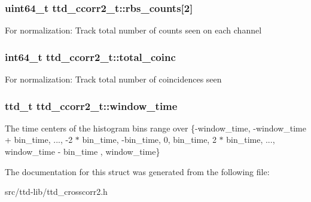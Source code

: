 \subsubsection[{rbs\+\_\+counts}]{\setlength{\rightskip}{0pt plus 5cm}uint64\+\_\+t ttd\+\_\+ccorr2\+\_\+t\+::rbs\+\_\+counts\mbox{[}2\mbox{]}}\label{structttd__ccorr2__t_a8413d9d1551e1fafbaf6d168ca997b0c}
For normalization\+: Track total number of counts seen on each channel \hypertarget{structttd__ccorr2__t_a127fca4b0a397dc24cf6c3165273ca97}{}
\subsubsection[{total\+\_\+coinc}]{\setlength{\rightskip}{0pt plus 5cm}int64\+\_\+t ttd\+\_\+ccorr2\+\_\+t\+::total\+\_\+coinc}\label{structttd__ccorr2__t_a127fca4b0a397dc24cf6c3165273ca97}
For normalization\+: Track total number of coincidences seen \hypertarget{structttd__ccorr2__t_a2afa4d3a622ea10c731181ecaefc63c3}{}
\subsubsection[{window\+\_\+time}]{\setlength{\rightskip}{0pt plus 5cm}ttd\+\_\+t ttd\+\_\+ccorr2\+\_\+t\+::window\+\_\+time}\label{structttd__ccorr2__t_a2afa4d3a622ea10c731181ecaefc63c3}
The time centers of the histogram bins range over \{{\ttfamily -\/window\+\_\+time, -\/window\+\_\+time + bin\+\_\+time, ..., -\/2 $\ast$ bin\+\_\+time, -\/bin\+\_\+time, 0, bin\+\_\+time, 2 $\ast$ bin\+\_\+time, ..., window\+\_\+time -\/ bin\+\_\+time , window\+\_\+time}\} 

The documentation for this struct was generated from the following file\+:\begin{DoxyCompactItemize}
\item 
src/ttd-\/lib/ttd\+\_\+crosscorr2.\+h\end{DoxyCompactItemize}
